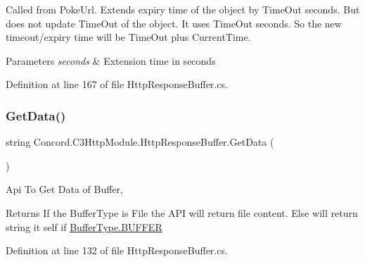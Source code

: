 Called from Poke\+Url. Extends expiry time of the object by Time\+Out seconds. But does not update Time\+Out of the object. It uses Time\+Out seconds. So the new timeout/expiry time will be Time\+Out plus Current\+Time. 


\begin{DoxyParams}{Parameters}
{\em seconds} & Extension time in seconds\\
\hline
\end{DoxyParams}


Definition at line 167 of file Http\+Response\+Buffer.\+cs.

\mbox{\label{class_concord_1_1_c3_http_module_1_1_http_response_buffer_a78e479ce9315db0f118145e814926b48}} 
\subsubsection{\texorpdfstring{GetData()}{GetData()}}
{\footnotesize\ttfamily string Concord.\+C3\+Http\+Module.\+Http\+Response\+Buffer.\+Get\+Data (\begin{DoxyParamCaption}{ }\end{DoxyParamCaption})\hspace{0.3cm}{\ttfamily [inline]}}



Api To Get Data of Buffer, 

\begin{DoxyReturn}{Returns}
If the Buffer\+Type is File the A\+PI will return file content. Else will return string it self if \mbox{\hyperlink{class_concord_1_1_c3_http_module_1_1_http_response_buffer_a34a310395d4f4472b24cf6da3fc3ab82a17de626bcae5109bb2f7a66dfc4a8a1d}{Buffer\+Type.\+B\+U\+F\+F\+ER}}
\end{DoxyReturn}


Definition at line 132 of file Http\+Response\+Buffer.\+cs.

